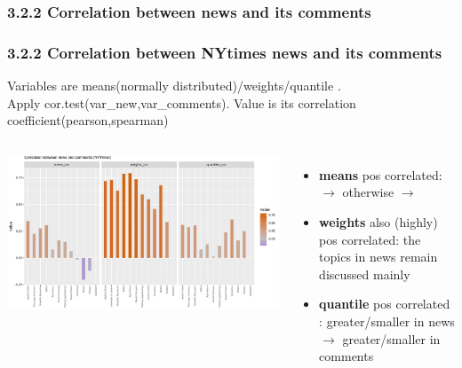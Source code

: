\documentclass{tum-presentation}
\begin{document}
\subsubsection{3.2.2 Correlation between news and its comments }
\begin{frame}

  \frametitle{3.2.2 Correlation between NYtimes news and its comments}
Variables are means(normally distributed)/weights/quantile . 
\\Apply cor.test(var\_new,var\_comments). Value is its correlation coefficient(pearson,spearman)

  \begin{columns}[t]
    \begin{minipage}[c]{\linewidth}
        \centering
        \includegraphics[width=0.85\linewidth]{figures/cor_bar_NYTimes.pdf}
    \end{minipage}
    \begin{minipage}[c]{\linewidth}
      \begin{itemize}
        \item \textbf{means} pos correlated: \smiley{} $\rightarrow$ \smiley{} otherwise  \smiley{} $\rightarrow$  \frownie{} 
        \item \textbf{weights} also (highly) pos correlated: the topics in news remain discussed mainly
        \item \textbf{quantile} pos correlated : greater/smaller in news $\rightarrow$ greater/smaller in comments
      \end{itemize}
  \end{minipage}
  \end{columns}
\end{frame}
\end{document}
